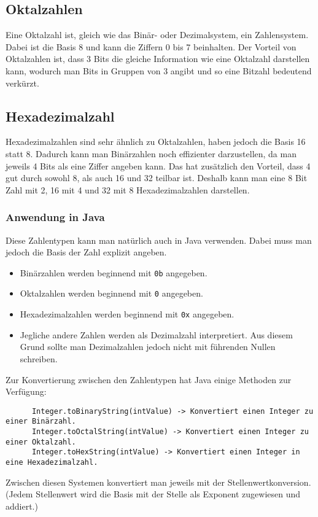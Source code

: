 \documentclass{article}
\begin{document}
	  \subsection{Oktalzahlen}
	  Eine Oktalzahl ist, gleich wie das Binär- oder Dezimalsystem, ein Zahlensystem. Dabei ist die Basis 8 und kann die Ziffern 0 bis 7 beinhalten. Der Vorteil von Oktalzahlen ist, dass 3 Bits die gleiche Information wie eine Oktalzahl darstellen kann, wodurch man Bits in Gruppen von 3 angibt und so eine Bitzahl bedeutend verkürzt.
	  \subsection{Hexadezimalzahl}
	  Hexadezimalzahlen sind sehr ähnlich zu Oktalzahlen, haben jedoch die Basis 16 statt 8. Dadurch kann man Binärzahlen noch effizienter darzustellen, da man jeweils 4 Bits als eine Ziffer angeben kann. Das hat zusätzlich den Vorteil, dass 4 gut durch sowohl 8, als auch 16 und 32 teilbar ist. Deshalb kann man eine 8 Bit Zahl mit 2, 16 mit 4 und 32 mit 8 Hexadezimalzahlen darstellen.
	  \subsubsection{Anwendung in Java}
	  Diese Zahlentypen kann man natürlich auch in Java verwenden. Dabei muss man jedoch die Basis der Zahl explizit angeben.
	  \begin{itemize}
	  	\item{Binärzahlen werden beginnend mit \verb|0b| angegeben.}
	  	\item{Oktalzahlen werden beginnend mit \verb|0| angegeben.}
	  	\item{Hexadezimalzahlen werden beginnend mit \verb|0x| angegeben.}
	  	\item{Jegliche andere Zahlen werden als Dezimalzahl interpretiert. Aus diesem Grund sollte man Dezimalzahlen jedoch nicht mit führenden Nullen schreiben.}
	  \end{itemize}
	  Zur Konvertierung zwischen den Zahlentypen hat Java einige Methoden zur Verfügung:
	  \begin{verbatim}
	  Integer.toBinaryString(intValue) -> Konvertiert einen Integer zu einer Binärzahl.
	  Integer.toOctalString(intValue) -> Konvertiert einen Integer zu einer Oktalzahl.
	  Integer.toHexString(intValue) -> Konvertiert einen Integer in eine Hexadezimalzahl.
	  \end{verbatim}
	  Zwischen diesen Systemen konvertiert man jeweils mit der Stellenwertkonversion. (Jedem Stellenwert wird die Basis mit der Stelle als Exponent zugewiesen und addiert.)
\end{document}
